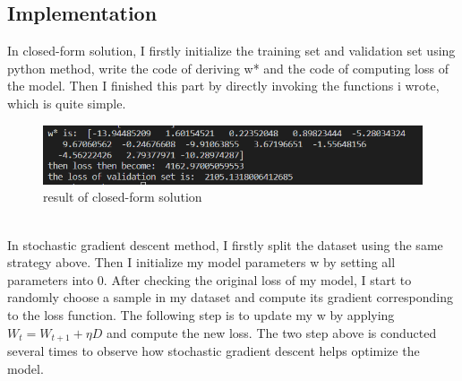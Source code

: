 \documentclass[journal, a4paper]{IEEEtran}
\begin{document}
\subsection{Implementation}
In closed-form solution, I firstly initialize the training set and validation set using python method, write the code of deriving w* and the code of computing loss of the model. Then I finished this part by directly invoking the functions i wrote, which is quite simple.
\begin{figure}[!hbt]
		\centering
		\includegraphics[width=\columnwidth]{closed-form.png}
		\caption{result of closed-form solution}
		\label{fig2}
\end{figure}\\

In stochastic gradient descent method, I firstly split the dataset using the same strategy above. Then I initialize my model parameters w by setting all parameters into 0. After checking the original loss of my model, I start to randomly choose a sample in my dataset and compute its gradient corresponding to the loss function. The following step is to update my w by applying $ W_t = W_{t+1} + \eta D $ and compute the new loss. The two step above is conducted several times to observe how stochastic gradient descent helps optimize the model.\par
\end{document}
